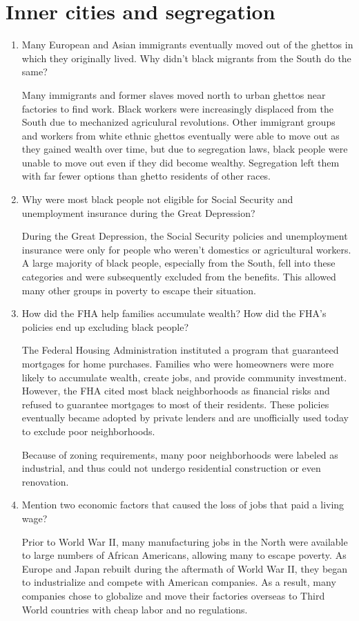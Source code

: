 \documentclass{article}
\begin{document}
\section*{Inner cities and segregation}
\begin{enumerate}
  \item Many European and Asian immigrants eventually moved out of the ghettos in which they originally lived. Why didn't black migrants from the South do the same?
  \par Many immigrants and former slaves moved north to urban ghettos near factories to find work. Black workers were increasingly displaced from the South due to mechanized agriculural revolutions. Other immigrant groups and workers from white ethnic ghettos eventually were able to move out as they gained wealth over time, but due to segregation laws, black people were unable to move out even if they did become wealthy. Segregation left them with far fewer options than ghetto residents of other races.
  \item Why were most black people not eligible for Social Security and unemployment insurance during the Great Depression?
  \par During the Great Depression, the Social Security policies and unemployment insurance were only for people who weren't domestics or agricultural workers. A large majority of black people, especially from the South, fell into these categories and were subsequently excluded from the benefits. This allowed many other groups in poverty to escape their situation.
  \item How did the FHA help families accumulate wealth? How did the FHA's policies end up excluding black people?
  \par The Federal Housing Administration instituted a program that guaranteed mortgages for home purchases. Families who were homeowners were more likely to accumulate wealth, create jobs, and provide community investment. However, the FHA cited most black neighborhoods as financial risks and refused to guarantee mortgages to most of their residents. These policies eventually became adopted by private lenders and are unofficially used today to exclude poor neighborhoods.
  \par Because of zoning requirements, many poor neighborhoods were labeled as industrial, and thus could not undergo residential construction or even renovation.
  \item Mention two economic factors that caused the loss of jobs that paid a living wage?
  \par Prior to World War II, many manufacturing jobs in the North were available to large numbers of African Americans, allowing many to escape poverty. As Europe and Japan rebuilt during the aftermath of World War II, they began to industrialize and compete with American companies. As a result, many companies chose to globalize and move their factories overseas to Third World countries with cheap labor and no regulations.

\end{enumerate}
\end{document}
